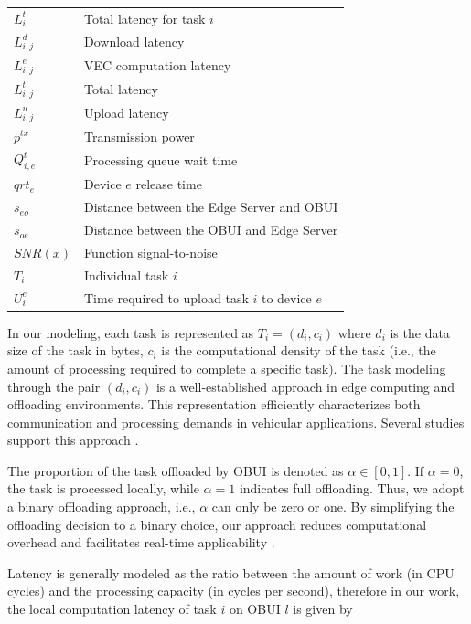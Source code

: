 \documentclass[iicol]{sn-jnl}
\begin{document}
\begin{table}[!ht]
\begin{tabular}{ll}
        $L_i^t$     & Total latency for task $i$ \\
        $L_{i,j}^d$ & Download latency \\
        $L_{i,j}^e$ & VEC computation latency \\
        $L_{i,j}^t$ & Total latency \\
        $L_{i,j}^u$ & Upload latency \\
        $p^{tx}$    & Transmission power \\
        $Q_{i,e}^t$ & Processing queue wait time \\
        $qrt_e$     & Device $e$ release time \\
        $s_{eo}$    & Distance between the Edge Server and OBUI \\
        $s_{oe}$    & Distance between the OBUI and Edge Server \\
        $SNR(x)$    & Function signal-to-noise \\
        $T_i$       & Individual task $i$ \\
        $U_i^e$     & Time required to upload task $i$ to device $e$ \\
        \bottomrule
    \end{tabular}
\end{table}

In our modeling, each task is represented as $T_i=(d_i,c_i)$ where $d_i$ is the data size of the task in bytes, $c_i$ is the computational density of the task (i.e., the amount of processing required to complete a specific task). The task modeling through the pair $(d_i,c_i)$ is a well-established approach in edge computing and offloading environments. This representation efficiently characterizes both communication and processing demands in vehicular applications. Several studies support this approach \cite{liu2021vehicular}\cite{zhang2022vehicular}\cite{guo2024deep}\cite{mirza2023drl}\cite{alam2024energy}\cite{kumari2022task}.
  
The proportion of the task offloaded by OBUI is denoted as $\alpha \in [0,1]$. If $\alpha=0$, the task is processed locally, while $\alpha=1$ indicates full offloading. Thus, we adopt a binary offloading approach, i.e., $\alpha$ can only be zero or one. By simplifying the offloading decision to a binary choice, our approach reduces computational overhead and facilitates real-time applicability \cite{liu2021vehicular}\cite{kumari2022task}.
 
Latency is generally modeled as the ratio between the amount of work (in CPU cycles) and the processing capacity (in cycles per second), therefore in our work, the local computation latency of task $i$ on OBUI $l$ is given by
\end{document}
